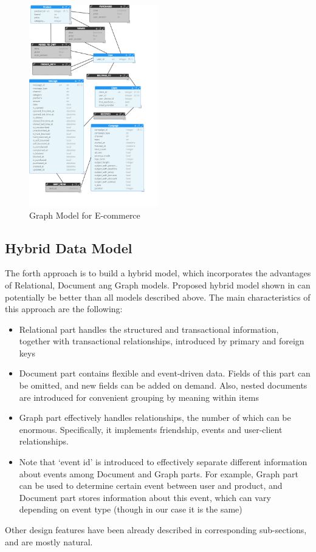 \documentclass[conference]{IEEEtran}
\begin{document}
\begin{figure}[htbp]
    \centerline{\includegraphics[width=0.5\textwidth]{../screenshots/Neo4jModelER.png}}
    \caption{Graph Model for E-commerce}\label{fig:neo4j_ermodel}
\end{figure}


\subsection{Hybrid Data Model}
The forth approach is to build a hybrid model, which incorporates the advantages of Relational, Document ang Graph models. Proposed hybrid model shown in  can potentially be better than all models described above. The main characteristics of this approach are the following:
\begin{itemize}
    \item Relational part handles the structured and transactional information, together with transactional relationships, introduced by primary and foreign keys
    \item Document part contains flexible and event-driven data. Fields of this part can be omitted, and new fields can be added on demand. Also, nested documents are introduced for convenient grouping by meaning within items
    \item Graph part effectively handles relationships, the number of which can be enormous. Specifically, it implements friendship, events and user-client relationships.
    \item Note that `event id' is introduced to effectively separate different information about events among Document and Graph parts. For example, Graph part can be used to determine certain event between user and product, and Document part stores information about this event, which can vary depending on event type (though in our case it is the same)
\end{itemize}
Other design features have been already described in corresponding sub-sections, and are mostly natural.
\end{document}
